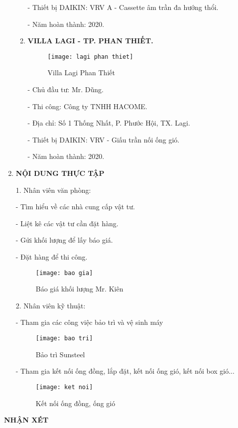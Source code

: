 \documentclass[12pt,a4paper]{article}
\newcommand{\Pointilles}[1]{%
  \par\nobreak
  \noindent\rule{0pt}{1.5\baselineskip} 
  \multido{}{#1}{\noindent\makebox[\linewidth]{\dotfill}\endgraf}
  \bigskip
}
\begin{document}
\begin{enumerate}
\begin{enumerate}
\hspace{1cm} - Thiết bị DAIKIN: VRV A - Cassette âm trần đa hướng thổi.

\hspace{1cm} - Năm hoàn thành: 2020.

\item \textbf{VILLA LAGI - TP. PHAN THIẾT.}
\begin{figure}[htbp]
  \centering
  \texttt{[image: lagi phan thiet]}
  \caption{Villa Lagi Phan Thiết}
\end{figure}

\hspace{1cm} - Chủ đầu tư: Mr. Dũng.

\hspace{1cm} - Thi công: Công ty TNHH HACOME.

\hspace{1cm} - Địa chỉ: Số 1 Thống Nhất, P. Phước Hội, TX. Lagi.

\hspace{1cm} - Thiết bị DAIKIN: VRV - Giấu trần nối ống gió.

\hspace{1cm} - Năm hoàn thành: 2020.
\newpage

\end{enumerate}
\item \textbf{NỘI DUNG THỰC TẬP}

1. Nhân viên văn phòng:

\hspace{1cm} - Tìm hiểu về các nhà cung cấp vật tư.

\hspace{1cm} - Liệt kê các vật tư cần đặt hàng.

\hspace{1cm} - Gửi khối lượng để lấy báo giá.

\hspace{1cm} - Đặt hàng để thi công.
	
\begin{figure}[H]
  \centering
  \texttt{[image: bao gia]}
  \caption{Báo giá khối lượng Mr. Kiên }
\end{figure}

2. Nhân viên kỹ thuật:

\hspace{1cm} - Tham gia các công việc bảo trì và vệ sinh máy
\begin{figure}[htbp]
  \centering
  \texttt{[image: bao tri]}
  \caption{Bảo trì Sunsteel }
\end{figure}

\newpage
\hspace{1cm} - Tham gia kết nối ống đồng, lắp đặt, kết nối ống gió, kết nối box gió...
\begin{figure}[H]
  \centering
  \texttt{[image: ket noi]}
  \caption{Kết nối ống đồng, ống gió }
\end{figure}

\end{enumerate}

\newpage
\begin{center}
  {\Huge \textbf{NHẬN XÉT }}
\end{center}
\Pointilles{44}
\end{document}
